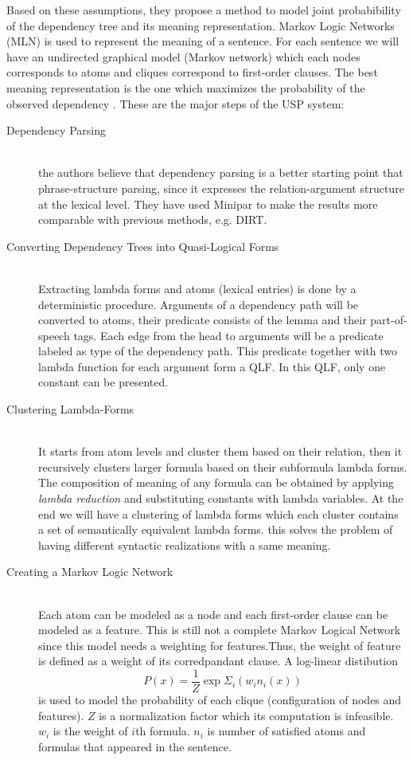 \documentclass[12pt]{report}
\begin{document}
Based on these assumptions, they propose a method to model joint probabibility of the dependency tree
and its meaning representation. Markov Logic Networks (MLN) \cite{Richardson2006} is used to represent the meaning of a sentence.
For each sentence we will have an undirected graphical model (Markov network) which each nodes corresponds to atoms
and cliques correspond to first-order clauses. The best meaning representation is the one which 
maximizes the probability of the observed dependency \cite{Titov2011}.
These are the major steps of the USP system:
\begin{description}
  \item[Dependency Parsing] \hfill \\
  the authors believe that dependency parsing is a better starting point that phrase-structure parsing, since it expresses
   the relation-argument structure at the lexical level. They have used Minipar \cite{Lin2002} to make the results more comparable with previous
   methods, e.g. DIRT.
  \item[Converting Dependency Trees into Quasi-Logical Forms] \hfill \\
  Extracting lambda forms and atoms (lexical entries) is done by a deterministic procedure. 
  Arguments of a dependency path will be converted to atoms, their predicate consists of the lemma and their part-of-speech tags.
  Each edge from the head to arguments will be a predicate labeled as type of the dependency path.
  This predicate together with two lambda function for each argument form a QLF. In this QLF, only one constant can be presented.
  
  \item[Clustering Lambda-Forms] \hfill \\
  It starts from atom levels and cluster them based on their relation, then it recursively clusters larger formula
  based on their subformula lambda forms. The composition of meaning of any formula can be obtained by applying
  \emph{lambda reduction} and substituting constants with lambda variables. At the end we will have a clustering
  of lambda forms which each cluster contains a set of semantically equivalent lambda forms. this solves
   the problem of having different syntactic realizations with a same meaning.
  
  \item[Creating a Markov Logic Network] \hfill \\
  Each atom can be modeled as a node and each first-order clause can be modeled as a feature. This is still not a complete Markov Logical
  Network since this model needs a weighting for features.Thus, the weight of feature is defined as a weight of
  its corredpandant clause. A log-linear distibution 
  $$ P(x) = \frac{1}{Z}\exp{\Sigma_i{(w_i n_i (x))}} $$
  is used to model the probability of each clique (configuration of nodes and features).
  $Z$ is a normalization factor which its computation is infeasible. $w_i$ is the weight of $i$th formula.
  $n_i$ is number of satisfied atoms and formulas that appeared in the sentence. 
   

\end{description}
\end{document}
